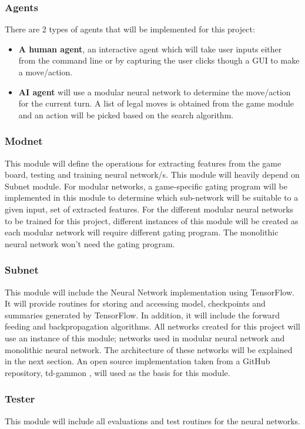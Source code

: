 \documentclass[12pt,a4paper]{article}
\begin{document}
\subsubsection{Agents}
There are 2 types of agents that will be implemented for this project: 
\begin{itemize}
    \item \textbf{A human agent}, an interactive agent which will take user inputs either from the command line or by capturing the user clicks though a GUI to make a move/action.
    \item \textbf{AI agent} will use a modular neural network to determine the move/action for the current turn. A list of legal moves is obtained from the game module and an action will be picked based on the search algorithm.
\end{itemize}

\subsubsection{Modnet}
This module will define the operations for extracting features from the game board, testing and training neural network/s. This module will heavily depend on Subnet module. For modular networks, a game-specific gating program will be implemented in this module to determine which sub-network will be suitable to a given input, set of extracted features. For the different modular neural networks to be trained for this project, different instances of this module will be created as each modular network will require different gating program. The monolithic neural network won't need the gating program.

\subsubsection{Subnet}
This module will include the Neural Network implementation using TensorFlow. It will provide routines for storing and accessing model, checkpoints and summaries generated by TensorFlow. In addition, it will include the forward feeding and backpropagation algorithms. All networks created for this project will use an instance of this module; networks used in modular neural network and monolithic neural network. The architecture of these networks will be explained in the next section. An open source implementation taken from a GitHub repository, td-gammon \cite{fomorians}, will used as the basis for this module. 

\subsubsection{Tester}
This module will include all evaluations and test routines for the neural networks. 
\end{document}
